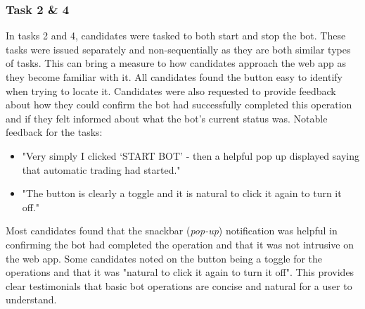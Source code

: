 
\subsubsection{Task 2 \& 4}
\label{sec:evaluation:ui:tasks:q2_q4}
\noindent In tasks 2 and 4, candidates were tasked to both start and stop the bot. These tasks were issued separately and non-sequentially as they are both similar types of tasks. This can bring a measure to how candidates approach the web app as they become familiar with it. All candidates found the button easy to identify when trying to locate it. Candidates were also requested to provide feedback about how they could confirm the bot had successfully completed this operation and if they felt informed about what the bot's current status was. Notable feedback for the tasks:
\begin{itemize}
\item "Very simply I clicked `START BOT' - then a helpful pop up displayed saying that automatic trading had started."
\item "The button is clearly a toggle and it is natural to click it again to turn it off."
\end{itemize}
Most candidates found that the snackbar (\textit{pop-up}) notification was helpful in confirming the bot had completed the operation and that it was not intrusive on the web app. Some candidates noted on the button being a toggle for the operations and that it was "natural to click it again to turn it off". This provides clear testimonials that basic bot operations are concise and natural for a user to understand.

